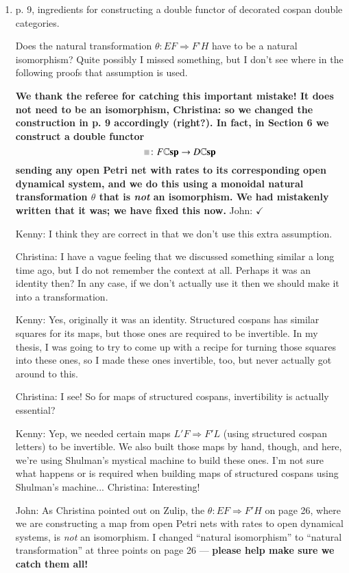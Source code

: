 \documentclass[reqno]{amsart}
\newcommand*{\graysquare}{\textcolor{lightgray}{\blacksquare}}
\newcommand{\double}[1]{\mathbf{\mathbb #1}}
\newcommand{\lCsp}{\double{Csp}}
\def\chris{\color{purple} Christina: }
\def\john{\color{red} John: }
\def\kenny{\color{blue} Kenny: }
\begin{document}
\begin{enumerate}
\item p. 9, ingredients for constructing a double functor of decorated cospan double categories.

Does the natural transformation $\theta \colon EF \Rightarrow F’ H$ have to be a natural isomorphism? Quite possibly I missed something, but I don’t see where in 
the following proofs that assumption is used.

{\bf We thank the referee for catching this important mistake!   It does not need to be an isomorphism, {\chris so we changed the construction in p. 
9 accordingly} (right?).
In fact, in Section 6 we construct a double functor
\[      \graysquare \colon F \lCsp \to D \lCsp \]
sending any open Petri net with rates to its corresponding open dynamical system, and we do this
using a monoidal natural transformation $\theta$ that is \emph{not} an isomorphism.  We had mistakenly written that it was; we have fixed this now.}
{\john $\checkmark$}

{\kenny I think they are correct in that we don't use this extra assumption.}

{\chris I have a vague feeling that we discussed something similar a long time ago, but I do not remember the context at all. Perhaps it was an 
identity then? In any case, if we don't actually use it then we should make it into a transformation.}

{\kenny Yes, originally it was an identity. Structured cospans has similar squares for its maps, but those ones are required to be invertible. In my 
thesis, I was going to try to come up with a recipe for turning those squares into these ones, so I made these ones invertible, too, but never 
actually got around to this.}

{\chris I see! So for maps of structured cospans, invertibility is actually essential?}

{\kenny Yep, we needed certain maps $L' F \Rightarrow F' L$ (using structured cospan letters) to be invertible. We also built those maps by hand, 
though, and here, we're using Shulman's mystical machine to build these ones. I'm not sure what happens or is required when building maps of 
structured cospans using Shulman's machine...} {\chris Interesting!}

{\john  As Christina pointed out on Zulip, the $\theta : EF \Rightarrow F'H$ on page 26, where we are
constructing a map from open Petri nets with rates to open dynamical systems, is \emph{not} an
isomorphism.  I changed ``natural isomorphism'' to ``natural transformation'' at three points on page 26 --- 
{\bf please help make sure we catch them all!}

}
\end{enumerate}
\end{document}
